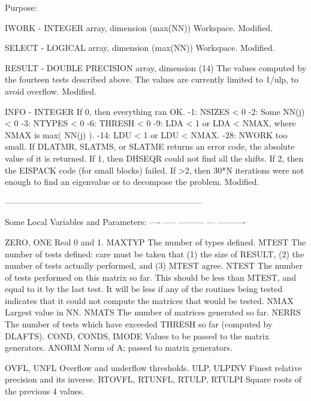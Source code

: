\begin{DoxyParagraph}{Purpose\+: }
\begin{DoxyVerb}
  IWORK  - INTEGER array, dimension (max(NN))
           Workspace.
           Modified.

  SELECT - LOGICAL array, dimension (max(NN))
           Workspace.
           Modified.

  RESULT - DOUBLE PRECISION array, dimension (14)
           The values computed by the fourteen tests described above.
           The values are currently limited to 1/ulp, to avoid
           overflow.
           Modified.

  INFO   - INTEGER
           If 0, then everything ran OK.
            -1: NSIZES < 0
            -2: Some NN(j) < 0
            -3: NTYPES < 0
            -6: THRESH < 0
            -9: LDA < 1 or LDA < NMAX, where NMAX is max( NN(j) ).
           -14: LDU < 1 or LDU < NMAX.
           -28: NWORK too small.
           If  DLATMR, SLATMS, or SLATME returns an error code, the
               absolute value of it is returned.
           If 1, then DHSEQR could not find all the shifts.
           If 2, then the EISPACK code (for small blocks) failed.
           If >2, then 30*N iterations were not enough to find an
               eigenvalue or to decompose the problem.
           Modified.

-----------------------------------------------------------------------

     Some Local Variables and Parameters:
     ---- ----- --------- --- ----------

     ZERO, ONE       Real 0 and 1.
     MAXTYP          The number of types defined.
     MTEST           The number of tests defined: care must be taken
                     that (1) the size of RESULT, (2) the number of
                     tests actually performed, and (3) MTEST agree.
     NTEST           The number of tests performed on this matrix
                     so far.  This should be less than MTEST, and
                     equal to it by the last test.  It will be less
                     if any of the routines being tested indicates
                     that it could not compute the matrices that
                     would be tested.
     NMAX            Largest value in NN.
     NMATS           The number of matrices generated so far.
     NERRS           The number of tests which have exceeded THRESH
                     so far (computed by DLAFTS).
     COND, CONDS,
     IMODE           Values to be passed to the matrix generators.
     ANORM           Norm of A; passed to matrix generators.

     OVFL, UNFL      Overflow and underflow thresholds.
     ULP, ULPINV     Finest relative precision and its inverse.
     RTOVFL, RTUNFL,
     RTULP, RTULPI   Square roots of the previous 4 values.


\end{DoxyVerb}
\end{DoxyParagraph}
